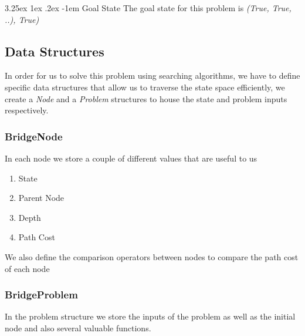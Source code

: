 \documentclass[12pt]{diazessay}
\makeatletter
\renewcommand\paragraph{\@startsection{paragraph}{5}{\z@}%
  {3.25ex \@plus1ex \@minus.2ex}%
  {-1em}%
  {\normalfont\normalsize\bfseries}}
\makeatother
\begin{document}
        \paragraph{Goal State}
            The goal state for this problem is \textit{(True, True, ..), True)}
        
        
    \subsection{Data Structures}
        In order for us to solve this problem using searching algorithms, we have to define specific data structures that allow us to traverse the state space efficiently, we create a \textit{Node} and a \textit{Problem} structures to house the state and problem inputs respectively. 
        \subsubsection{BridgeNode}
            In each node we store a couple of different values that are useful to us
            \begin{enumerate}
                \item State
                \item Parent Node
                \item Depth
                \item Path Cost
            \end{enumerate}
            We also define the comparison operators between nodes to compare the path cost of each node
        \subsubsection{BridgeProblem}
            In the problem structure we store the inputs of the problem as well as the initial node and also several valuable functions.
\end{document}
